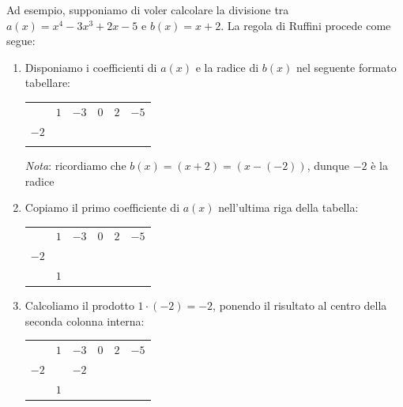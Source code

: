 \documentclass[a4paper, 12pt]{report}
\begin{document}
    \newpage

    Ad esempio, supponiamo di voler calcolare la divisione tra  $a(x)=x^4-3x^3+2x-5$ e $b(x)=x+2$. La regola di Ruffini procede come segue:
    \begin{enumerate}
        \item Disponiamo i coefficienti di $a(x)$ e la radice di $b(x)$ nel seguente formato tabellare:
        \begin{center}
            \begin{tabular}{c | c c c c | c}
                 & $1$ & $-3$ & $0$ & $2$ & $-5$\\
            $-2$ &       &  &  & & \\
            \hline
                &  &  &  &  & \\
            \end{tabular}
        \end{center}

        \textit{Nota}: ricordiamo che $b(x) = (x+2) = (x-(-2))$, dunque $-2$ è la radice

        \item Copiamo il primo coefficiente di $a(x)$ nell'ultima riga della tabella:

        \begin{center}
            \begin{tabular}{c | c c c c | c}
                 & $1$ & $-3$ & $0$ & $2$ & $-5$\\
            $-2$ &       &  &  & & \\
            \hline
                &  $1$ &  &  &  & \\
            \end{tabular}
        \end{center}

        \item Calcoliamo il prodotto $1 \cdot (-2) = -2$, ponendo il risultato al centro della seconda colonna interna:
        
        \begin{center}
            \begin{tabular}{c | c c c c | c}
                 & $1$ & $-3$ & $0$ & $2$ & $-5$\\
            $-2$ &       & $-2$ &  & & \\
            \hline
                &  $1$ &  &  &  & \\
            \end{tabular}
        \end{center}


\end{enumerate}
\end{document}
